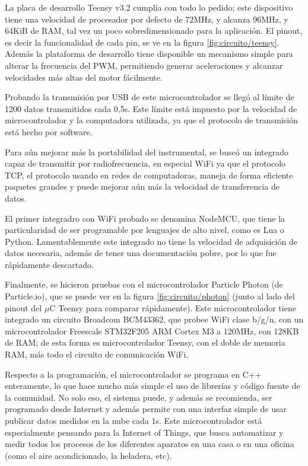 La placa de desarrollo Teensy v3.2\cite{teensy} cumplía con todo lo pedido; este dispositivo tiene una velocidad de procesador por defecto de 72MHz, y alcanza 96MHz, y 64KiB de RAM, tal vez un poco sobredimensionado para la aplicación. El pinout, es decir la funcionalidad de cada pin, se ve en la figura \ref{fig:circuito/teensy}. Además la plataforma de desarrollo tiene disponible un mecanismo simple para alterar la frecuencia del PWM, permitiendo generar aceleraciones y alcanzar velocidades más altas del motor fácilmente.

Probando la transmisión por USB de este microcontrolador se llegó al límite de 1200 datos transmitidos cada 0,5s. Este límite está impuesto por la velocidad de microcontrolador y la computadora utilizada, ya que el protocolo de transmisión está hecho por software.

Para aún mejorar más la portabilidad del instrumental, se buscó un integrado capaz de transmitir por radiofrecuencia, en especial WiFi ya que el protocolo TCP, el protocolo usando en redes de computadoras, maneja de forma eficiente paquetes grandes y puede mejorar aún más la velocidad de transferencia de datos.

El primer integradro con WiFi probado se denomina NodeMCU, que tiene la particularidad de ser programable por lenguajes de alto nivel, como es Lua o Python. Lamentablemente este integrado no tiene la velocidad de adquisición de datos necesaria, además de tener una documentación pobre, por lo que fue rápidamente descartado.

Finalmente, se hicieron pruebas con el microcontrolador Particle Photon\cite{particle_photon} (de Particle.io), que se puede ver en la figura \ref{fig:circuito/photon} (junto al lado del pinout del $\mu$C Teensy para comparar rápidamente). Este microcontrolador tiene integrado un circuito Broadcom BCM43362, que probee WiFi clase b/g/n, con un microcontrolador Freescale STM32F205 ARM Cortex M3 a 120MHz, con 128KB de RAM; de esta forma es microcontrolador Teensy, con el doble de memoria RAM, más todo el circuito de comunicación WiFi. 

 Respecto a la programación, el microcontrolador se programa en C++ enteramente, lo que hace mucho más simple el uso de librerías y código fuente de la comunidad. No solo eso, el sistema puede, y además se recomienda, ser programado desde Internet y además permite con una interfaz simple de usar publicar datos medidos en la nube cada 1s. Este microcontrolador está especialmente pensando para la Internet of Things, que busca automatizar y medir todos los procesos de los diferentes aparatos en una casa o en una oficina (como el aire acondicionado, la heladera, etc).

